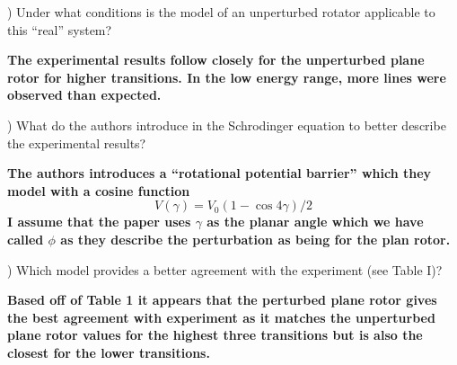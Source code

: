 \documentclass[a4paper, 11pt]{article}
\newenvironment{solution}{%
	\begin{list}{}{%
			\setlength{\topsep}{0pt}%
			\setlength{\leftmargin}{1.5cm}%
			\setlength{\rightmargin}{1.5cm}%
			\setlength{\listparindent}{\parindent}%
			\setlength{\itemindent}{\parindent}%
			\setlength{\parsep}{\parskip}%
		}%
		\item[]}{\end{list}}
\begin{document}
) Under what conditions is the model of an unperturbed rotator applicable to this ``real'' system?\\
\begin{solution}\noindent\textbf{The experimental results follow closely for the unperturbed plane rotor for higher transitions. In the low energy range, more lines were observed than expected.\\}\end{solution}

) What do the authors introduce in the Schrodinger equation to better describe the experimental results? \\
\begin{solution}\noindent\textbf{The authors introduces a ``rotational potential barrier''  which they model with a cosine function
    \begin{equation*}
      V(\gamma) = V_0(1-\cos4\gamma)/2
    \end{equation*}
    I assume that the paper uses $\gamma$ as the planar angle which we have called $\phi$ as they describe the perturbation as being for the plan rotor. \\}\end{solution}

) Which model provides a better agreement with the experiment (see Table I)? \\
\begin{solution}\noindent\textbf{Based off of Table 1 it appears that the perturbed plane rotor gives the best agreement with experiment as it matches the unperturbed plane rotor values for the highest three transitions but is also the closest for the lower transitions.\\}\end{solution}
\end{document}
